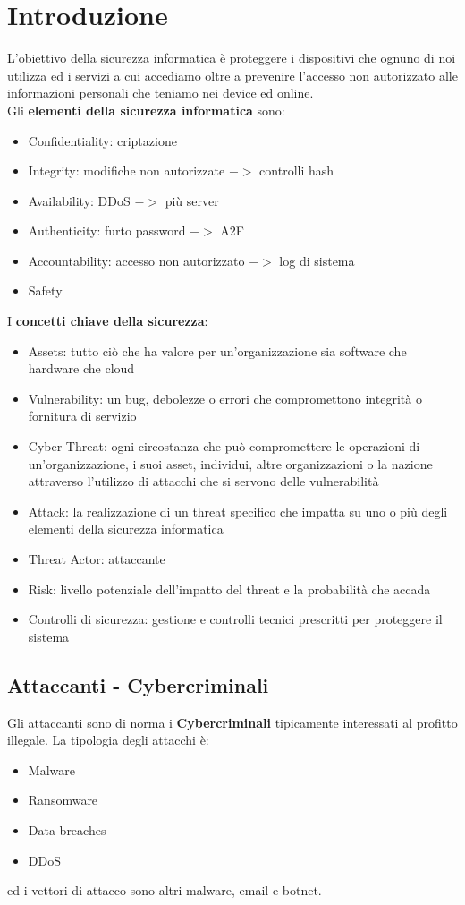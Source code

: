 \section{Introduzione}
\label{sec:introduzione}
L'obiettivo della sicurezza informatica è proteggere i dispositivi che ognuno di noi utilizza ed i servizi a cui accediamo oltre a prevenire l'accesso non autorizzato alle informazioni personali che teniamo nei device ed online.\\
Gli \textbf{elementi della sicurezza informatica} sono:
\begin{itemize}[noitemsep]
    \item Confidentiality: criptazione
    \item Integrity: modifiche non autorizzate $->$ controlli hash
    \item Availability: \acrfull{DDoS} $->$ più server
    \item Authenticity: furto password $->$ A2F
    \item Accountability: accesso non autorizzato $->$ log di sistema
    \item Safety
\end{itemize}
I \textbf{concetti chiave della sicurezza}:
\begin{itemize}[noitemsep]
    \item Assets: tutto ciò che ha valore per un'organizzazione sia software che hardware che cloud
    \item Vulnerability: un bug, debolezze o errori che compromettono integrità o fornitura di servizio
    \item Cyber Threat: ogni circostanza che può compromettere le operazioni di un'organizzazione, i suoi asset, individui, altre organizzazioni o la nazione attraverso l'utilizzo di attacchi che si servono delle vulnerabilità
    \item Attack: la realizzazione di un threat specifico che impatta su uno o più degli elementi della sicurezza informatica
    \item Threat Actor: attaccante
    \item Risk: livello potenziale dell'impatto del threat e la probabilità che accada
    \item Controlli di sicurezza: gestione e controlli tecnici prescritti per proteggere il sistema
\end{itemize}

\subsection{Attaccanti - Cybercriminali}
Gli attaccanti sono di norma i \textbf{Cybercriminali} tipicamente interessati al profitto illegale.
La tipologia degli attacchi è:
\begin{itemize}[noitemsep]
    \item Malware
    \item Ransomware
    \item Data breaches
    \item \acrshort{DDoS}
\end{itemize}
ed i vettori di attacco sono altri malware, email e botnet.


